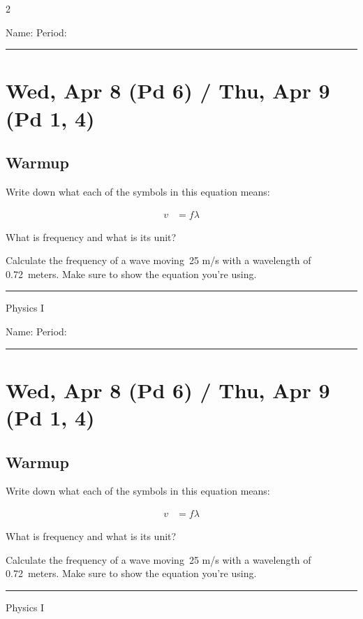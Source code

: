 \documentclass[10pt,landscape]{exam}
\def\todayDate{Wed, Apr 8 (Pd 6) / Thu, Apr 9 (Pd 1, 4)}
\def\content{
\begin{questions}

  \question Write down what each of the symbols in this equation means:

  \begin{align*}
    v &=f\lambda
  \end{align*}

  \vs

  \question What is frequency and what is its unit? \vs 

  \question Calculate the frequency of a wave moving~25 m/s with a wavelength of 0.72~meters.  Make sure to show the equation you're using.  \vs
\end{questions}

}
\begin{document}
\pagestyle{empty}

\setlength{\columnsep}{0.8in}
\begin{multicols*}{2}

\noindent  
Name: \hfill Period: \hspace{5em}
\vspace{0.5em}
\hrule

\section*{\todayDate}
\subsection*{Warmup}

\content

\vfill
\hrule
\vspace{0.5em}
\hfill {\sc Physics I}

\columnbreak

\noindent  
Name: \hfill Period: \hspace{5em}
\vspace{0.5em}
\hrule

\section*{\todayDate}
\subsection*{Warmup}

\content

\vfill
\hrule
\vspace{0.5em}
\hfill {\sc Physics I}

\end{multicols*}
\end{document}
